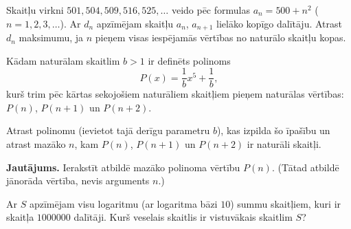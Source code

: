 \documentclass[a4paper,12pt]{article}
\newcommand\answer[1]{}
\begin{document}
\vspace{10pt}
\begin{problem}
Skaitļu virkni $501, 504, 509, 516, 525, \ldots$ veido pēc formulas $a_n = 500+n^2$ ($n = 1,2,3,\ldots$). 
Ar $d_n$ apzīmējam skaitļu $a_n$, $a_{n+1}$ lielāko kopīgo dalītāju. 
Atrast $d_n$ maksimumu, ja $n$ pieņem visas iespējamās vērtības no naturālo skaitļu kopas.
\answer{

{\bf Atbilde.} $\mathtt{2001}$.

Izteiksmēm $500 + n^2$ un $500 + n^2 + 2n + 1$ lieto Eiklīda algoritmu, pēc vairākiem 
pārveidojumu soļiem iegūst $\text{LKD}(n-1000, 2001)$.

}
\end{problem}


\vspace{10pt}
\begin{problem}
Kādam naturālam skaitlim $b>1$ ir definēts polinoms 
\[ P(x) = \frac{1}{b} x^5 + \frac{1}{b}, \] 
kurš trim pēc kārtas sekojošiem naturāliem skaitļiem pieņem 
naturālas vērtības: $P(n)$, 
$P(n+1)$ un $P(n+2)$. 

Atrast polinomu (ievietot tajā derīgu parametru $b$), kas izpilda šo īpašību un atrast mazāko $n$, kam $P(n)$, $P(n+1)$ un 
$P(n+2)$ ir naturāli skaitļi.

{\bf Jautājums.} Ierakstīt atbildē mazāko polinoma vērtību $P(n)$. (Tātad atbildē jānorāda vērtība, nevis arguments $n$.)
\answer{

{\bf Atbilde.} $\mathtt{707}$.

Var pamatot, ka vienīgā naturālā $b>1$ vērtība, kam trīs vērtības $x^5+1$ pēc kārtas dalās ar $b$ ir $b = 11$. 
Un jāievieto skaitļi $n = 6$, $n+1 = 7$, $n+2 = 8$. 
Ievietojot mazāko $n$, iegūstam: 
\[ (6^5 + 1) / 11 = 7777 / 11 = 707. \]
}
\end{problem}



\vspace{10pt}
\begin{problem}
Ar $S$ apzīmējam visu logaritmu (ar logaritma bāzi $10$) summu skaitļiem, kuri 
ir skaitļa $1000000$ dalītāji. Kurš veselais skaitlis ir vistuvākais skaitlim $S$? 
\answer{

{\bf Atbilde.} $\mathtt{147}$.

Skaitlim $1000000 = 2^6 5^6$ dalītāju skaitu var atrast ar izteiksmi: 
\[ \sigma_0(1000000) = (1 + 6)\cdot (1 + 6) = 49. \]
Viens no dalītājiem ir $d = 1000$, kura logaritms ir $3$. 
Visi citi ir sadalāmi pa pāriem tā, ka $ab = 1000000$; 
tāpēc $\log_{10} a + \log_{10} b = 6$. Vidēji jāpieskaita $3$ uz katru dalītāju. 

Visu šo logaritmu summa būs $3 \cdot 49 = 147$. 
}
\end{problem}
\end{document}
